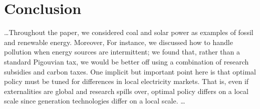 \documentclass[11pt,a4paper]{extarticle}
\begin{document}










\section{Conclusion}

\dots Throughout the paper, we considered coal and solar power as examples of fossil and renewable energy. Moreover, 
For instance, we discussed how to handle pollution when energy sources are intermittent; we found that, rather than a standard Pigouvian tax, we would be better off using a combination of research subsidies and carbon taxes. One implicit but important point here is that optimal policy must be tuned for differences in local electricity markets. That is, even if externalities are global and research spills over, optimal policy differs on a local scale since generation technologies differ on a local scale. \dots
\end{document}
